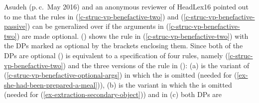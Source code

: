 Asudeh (p.\,c.\ May 2016) and an anonymous reviewer of Head\-Lex16 pointed out to me that the rules in
(\ref{c-struc-vp-benefactive-two}) and (\ref{c-struc-vp-benefactive-passive}) can be generalized over if
the arguments in (\ref{c-struc-vp-benefactive-two}) are made optional. () shows the rule in
(\ref{c-struc-vp-benefactive-two}) with the DPs marked as optional by the brackets enclosing them.
\ea\label{c-struc-vp-benefactive-optional-args}
\z
Since both of the DPs are optional () is equivalent to a specification of four rules, namely
(\ref{c-struc-vp-benefactive-two}) and the three versions of the rule in ():
\eal
\ex\label{c-struc-vp-benefactive-optional-args-otheta}
\ex\label{c-struc-vp-benefactive-optional-args-obj}
\ex\label{c-struc-vp-benefactive-optional-args-none}
\zl
(a) is the variant of (\ref{c-struc-vp-benefactive-optional-args}) in which the \lfgobj is
omitted (needed for (\ref{ex-she-had-been-prepared-a-meal})), (b) is the variant in which the
\objtheta is omitted (needed for (\ref{ex-extraction-secondary-object})) and in (c) both DPs are
